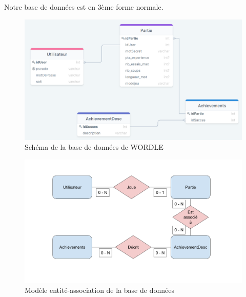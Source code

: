 Notre base de données est en 3ème forme normale.

\begin{figure}[h!]
    \centering
    \includegraphics[width=16cm]{figures/bddfinale.PNG}
    \caption{Schéma de la base de données de WORDLE}
\end{figure}

\begin{figure}[h!]
    \centering
    \includegraphics[width=16cm]{figures/modele_entite_association.png}
    \caption{Modèle entité-association de la base de données}
\end{figure}